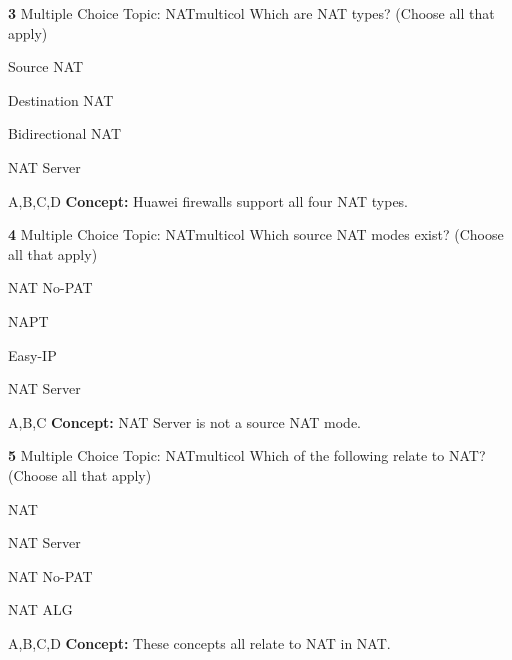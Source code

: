 \documentclass[10pt,a4paper]{article}
\begin{document}
\begin{qcard}{\color{white}\textbf{3} \hfill \small Multiple Choice \textbar{} Topic: NAT}{multicol}
Which are NAT types? (Choose all that apply)

\begin{qoptions}
\item Source NAT
\item Destination NAT
\item Bidirectional NAT
\item NAT Server
\end{qoptions}
\begin{explainbox}{A,B,C,D}
\textbf{Concept:} Huawei firewalls support all four NAT types.
\end{explainbox}
\end{qcard}

\begin{qcard}{\color{white}\textbf{4} \hfill \small Multiple Choice \textbar{} Topic: NAT}{multicol}
Which source NAT modes exist? (Choose all that apply)

\begin{qoptions}
\item NAT No-PAT
\item NAPT
\item Easy-IP
\item NAT Server
\end{qoptions}
\begin{explainbox}{A,B,C}
\textbf{Concept:} NAT Server is not a source NAT mode.
\end{explainbox}
\end{qcard}

\begin{qcard}{\color{white}\textbf{5} \hfill \small Multiple Choice \textbar{} Topic: NAT}{multicol}
Which of the following relate to NAT? (Choose all that apply)

\begin{qoptions}
\item NAT
\item NAT Server
\item NAT No-PAT
\item NAT ALG
\end{qoptions}
\begin{explainbox}{A,B,C,D}
\textbf{Concept:} These concepts all relate to NAT in NAT.
\end{explainbox}
\end{qcard}
\end{document}
